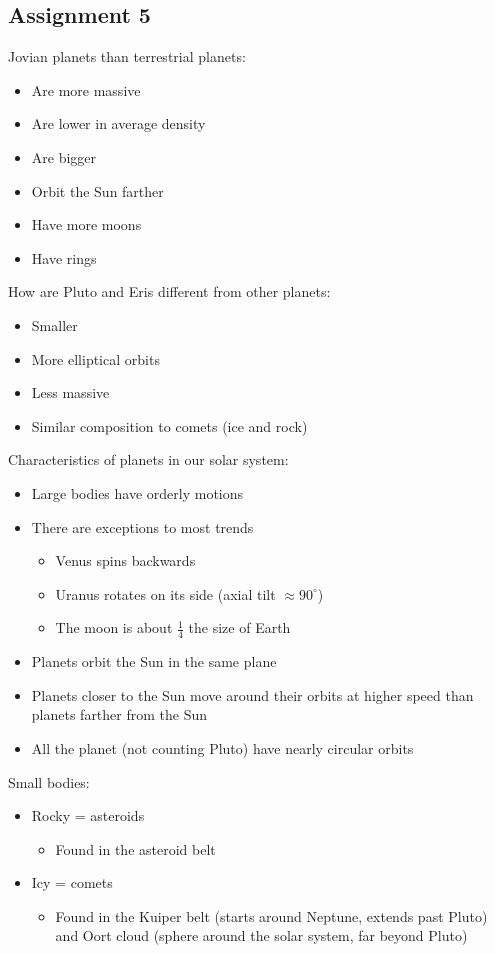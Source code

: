 \documentclass[12pt]{article}
\begin{document}
\subsection{Assignment 5}
Jovian planets \underline{\hspace{5em}} than terrestrial planets:
\begin{itemize}
\item Are more massive
\item Are lower in average density
\item Are bigger
\item Orbit the Sun farther
\item Have more moons
\item Have rings
\end{itemize}

How are Pluto and Eris different from other planets:
\begin{itemize}
\item Smaller
\item More elliptical orbits
\item Less massive
\item Similar composition to comets (ice and rock)
\end{itemize}

Characteristics of planets in our solar system:
\begin{itemize}
\item Large bodies have orderly motions
\item There are exceptions to most trends
\begin{itemize}
\item Venus spins backwards
\item Uranus rotates on its side (axial tilt $\approx 90^\circ$)
\item The moon is about $\frac{1}{4}$ the size of Earth
\end{itemize}
\item Planets orbit the Sun in the same plane
\item Planets closer to the Sun move  around their orbits at higher speed than planets farther from the Sun
\item All the planet (not counting Pluto) have nearly circular orbits
\end{itemize}

Small bodies:
\begin{itemize}
\item Rocky = asteroids
\begin{itemize}
\item Found in the asteroid belt
\end{itemize}
\item Icy = comets
\begin{itemize}
\item Found in the Kuiper belt (starts around Neptune, extends past Pluto) and Oort cloud (sphere around the solar system, far beyond Pluto)
\end{itemize}
\end{itemize}
\end{document}
